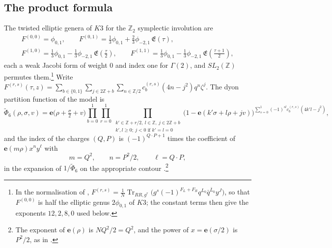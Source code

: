 \documentclass[11pt]{amsart}
\theoremstyle{definition}
\newcommand{\ZZ}{\mathbb{Z}}
\newcommand{\Phit}{\widetilde\Phi}
\newcommand{\fE}{\mathfrak E}
\newcommand{\pA}{\phi_{-2,1}}
\newcommand{\pB}{\phi_{0,1}}
\newcommand{\e}{\mathbf e}
\begin{document}
\subsection{The product formula}
The twisted elliptic genera of $K3$ for the $\ZZ_2$ symplectic involution are \cite{DJS06}
\begin{equation}\label{eq:genera}
\begin{gathered}
F^{(0,0)}=\pB,\qquad F^{(0,1)}=\tfrac13\pB+\tfrac23\pA\,\fE(\tau),\\
F^{(1,0)}=\tfrac13\pB-\tfrac13\pA\,\fE(\tfrac\tau2),\qquad F^{(1,1)}=\tfrac13\pB-\tfrac13\pA\,\fE(\tfrac{\tau+1}2),
\end{gathered}
\end{equation}
each a weak Jacobi form of weight $0$ and index one for $\Gamma(2)$, and $SL_2(\ZZ)$ permutes them.\footnote{In the normalisation of \cite{DJS06}, $F^{(r,s)}=\frac1N\operatorname{Tr}_{RR,g^r}\big(g^s(-1)^{F_L+F_R}q^{L_0}\bar q^{\bar L_0}y^J\big)$, so that $F^{(0,0)}$ is half the elliptic genus $2\pB$ of $K3$; the constant terms then give the exponents $12,2,8,0$ used below.} Write $F^{(r,s)}(\tau,z)=\sum_{b\in\{0,1\}}\sum_{j\in2\ZZ+b}\sum_{n\in\ZZ/2}c^{(r,s)}_b(4n-j^2)q^n\zeta^j$. The dyon partition function of the model is \cite{JS06,DJS06,DN07}
\begin{equation}\label{eq:product}
\Phit_6(\rho,\sigma,v)=\e\big(\rho+\tfrac\sigma2+v\big)\prod_{b=0}^1\prod_{r=0}^{1}\prod_{\substack{k'\in\ZZ+r/2,\ l\in\ZZ,\ j\in2\ZZ+b\\ k',l\ge0;\ j<0\text{ if }k'=l=0}}\big(1-\e(k'\sigma+l\rho+jv)\big)^{\sum_{s=0}^1(-1)^{sl}c^{(r,s)}_b(4k'l-j^2)} ,
\end{equation}
and the index of the charges $(Q,P)$ is $(-1)^{Q\cdot P+1}$ times the coefficient of $\e(m\rho)x^{n}y^\ell$ with
\begin{equation}\label{eq:charges}
m=Q^2,\qquad n=P^2/2,\qquad \ell=Q\cdot P,
\end{equation}
in the expansion of $1/\Phit_6$ on the appropriate contour \cite{DVV97,JS06,Sen07}.\footnote{The exponent of $\e(\rho)$ is $NQ^2/2=Q^2$, and the power of $x=\e(\sigma/2)$ is $P^2/2$, as in \cite[(5.15)]{BSS25}.}
\end{document}
